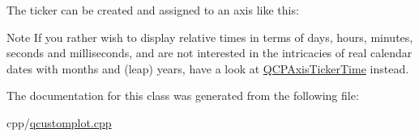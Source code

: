 The ticker can be created and assigned to an axis like this\+: 
\begin{DoxyCodeInclude}
\end{DoxyCodeInclude}
 \begin{DoxyNote}{Note}
If you rather wish to display relative times in terms of days, hours, minutes, seconds and milliseconds, and are not interested in the intricacies of real calendar dates with months and (leap) years, have a look at \mbox{\hyperlink{class_q_c_p_axis_ticker_time}{Q\+C\+P\+Axis\+Ticker\+Time}} instead. 
\end{DoxyNote}


The documentation for this class was generated from the following file\+:\begin{DoxyCompactItemize}
\item 
cpp/\mbox{\hyperlink{qcustomplot_8cpp}{qcustomplot.\+cpp}}\end{DoxyCompactItemize}
